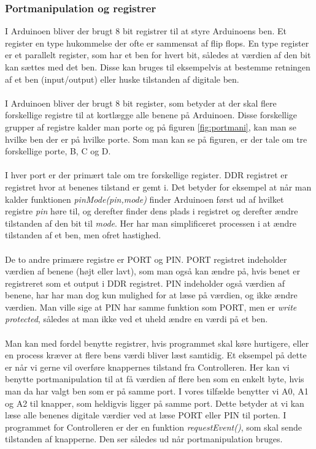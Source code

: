 \subsubsection{Portmanipulation og registrer}
I Arduinoen bliver der brugt 8 bit registrer til at styre Arduinoens ben. Et register en type hukommelse der ofte er sammensat af flip flops. En type register er et parallelt register, som har et ben for hvert bit, således at værdien af den bit kan sættes med det ben. Disse kan bruges til eksempelvis at bestemme retningen af et ben (input/output) eller huske tilstanden af digitale ben.\\
\\
I Arduinoen bliver der brugt 8 bit register, som betyder at der skal flere forskellige registre til at kortlægge alle benene på Arduinoen. Disse forskellige grupper af registre kalder man porte og på figuren \ref{fig:portmani}, kan man se hvilke ben der er på hvilke porte. Som man kan se på figuren, er der tale om tre forskellige porte, B, C og D. \\
\\
I hver port er der primært tale om tre forskellige register. DDR registret er registret hvor at benenes tilstand er gemt i. Det betyder for eksempel at når man kalder funktionen \textit{pinMode(pin,mode)} finder Arduinoen først ud af hvilket registre \textit{pin} høre til, og derefter finder dens plads i registret og derefter ændre tilstanden af den bit til \textit{mode}. Her har man simplificeret processen i at ændre tilstanden af et ben, men ofret hastighed.
\\
\\
De to andre primære registre er PORT og PIN. PORT registret indeholder værdien af benene (højt eller lavt), som man også kan ændre på, hvis benet er registreret som et output i DDR registret. PIN indeholder også værdien af benene, har har man dog kun mulighed for at læse på værdien, og ikke ændre værdien. Man ville sige at PIN har samme funktion som PORT, men er \textit{write protected}, således at man ikke ved et uheld ændre en værdi på et ben.
\\
\\
Man kan med fordel benytte registrer, hvis programmet skal køre hurtigere, eller en process kræver at flere bens værdi bliver læst samtidig. Et eksempel på dette er når vi gerne vil overføre knappernes tilstand fra Controlleren. Her kan vi benytte portmanipulation til at få værdien af flere ben som en enkelt byte, hvis man da har valgt ben som er på samme port. I vores tilfælde benytter vi A0, A1 og A2 til knapper, som heldigvis ligger på samme port. Dette betyder at vi kan læse alle benenes digitale værdier ved at læse PORT eller PIN til porten. I programmet for Controlleren er der en funktion \textit{requestEvent()}, som skal sende tilstanden af knapperne. Den ser således ud når portmanipulation bruges.
